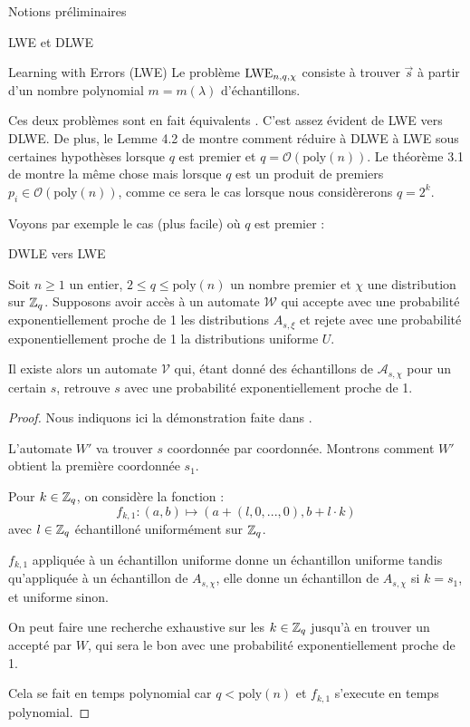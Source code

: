\begin{section}{Notions préliminaires}
\begin{subsection}{LWE et DLWE}
\begin{definition}{Learning with Errors (LWE)}
	Le problème $\text{LWE}_{n,q,\chi}$ consiste à trouver $\vec{s}$ à partir d'un nombre polynomial $m = m(\lambda)$ d'échantillons.
	\end{definition}

	Ces deux problèmes sont en fait \og équivalents \fg. C'est assez évident de LWE vers DLWE. De plus, le Lemme 4.2
	de \cite{STOC:Regev05} montre comment réduire à DLWE à LWE sous certaines hypothèses lorsque $q$ est premier et
	$q = \mathcal{O}(\text{poly}(n))$. Le théorème 3.1 de \cite{EPRINT:MicPei11} montre la même chose mais lorsque
	$q$ est un produit de premiers $p_i \in \mathcal{O}(\text{poly}(n))$, comme ce sera le cas lorsque nous
	considèrerons $q = 2^k$.

	Voyons par exemple le cas (plus facile) où $q$ est premier :

	\begin{prop}{DWLE vers LWE}

	Soit $n \geqslant 1$ un entier, $2 \leqslant q \leqslant \text{poly}(n)$ un nombre premier et $\chi$ une
	distribution sur $\mathbb{Z}_q$. Supposons avoir accès à un automate $\mathcal{W}$ qui accepte avec une probabilité
	exponentiellement proche de 1 les distributions $A_{s, \xi}$ et rejete avec une probabilité exponentiellement
	proche de 1 la distributions uniforme $U$.
	
	Il existe alors un automate $\mathcal{V}$ qui, étant donné des échantillons de $\mathcal{A}_{s,\chi}$ pour un
	certain $s$, retrouve $s$ avec une probabilité exponentiellement proche de 1.
	\end{prop}
	\begin{proof}
	Nous indiquons ici la démonstration faite dans \cite{STOC:Regev05}.
	
	L'automate $W'$ va trouver $s$ coordonnée par coordonnée. Montrons comment $W'$ obtient la première coordonnée $s_1$.
	
	Pour $k \in \mathbb{Z}_q$, on considère la fonction :
	\[f_{k,1}: (a,b) \mapsto (a + (l, 0, ..., 0), b + l \cdot k) \]
	avec $l\in \mathbb{Z}_q$ échantilloné uniformément sur $\mathbb{Z}_q$.
	
	$f_{k,1}$ appliquée à un échantillon uniforme donne un échantillon uniforme tandis qu'appliquée à un échantillon
	de $A_{s, \chi}$, elle donne un échantillon de $A_{s, \chi}$ si $k = s_1$, et uniforme sinon.
	
	On peut faire une recherche exhaustive sur les $k \in \mathbb{Z}_q$ jusqu'à en trouver un accepté par $W$, qui sera le
	bon avec une probabilité exponentiellement proche de 1.
	
	Cela se fait en temps polynomial car $q < \text{poly}(n)$ et $f_{k,1}$ s'execute en temps polynomial.
	

\end{proof}
\end{subsection}
\end{section}
